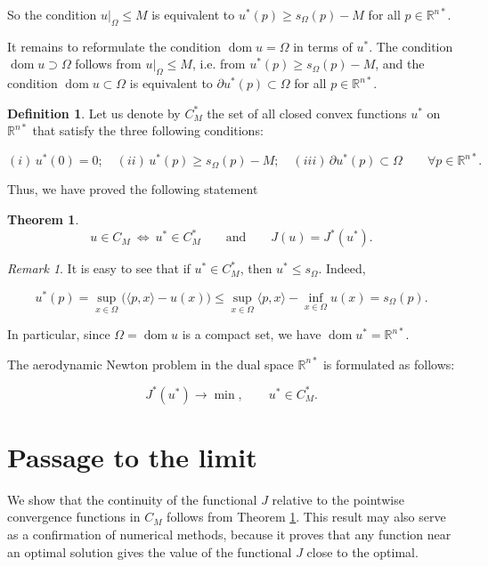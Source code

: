 \documentclass[14pt]{extarticle}
\renewcommand{\le}{\leqslant}
\renewcommand{\ge}{\geqslant}
\newcommand{\R}{\mathbb{R}}
\DeclareMathOperator{\dom}{\mathrm{dom}}
\newtheorem{thm}{Theorem}
\theoremstyle{remark}
\newtheorem{remark}{Remark}
\theoremstyle{definition}
\newtheorem{defn}{Definition}
\begin{document}
\noindent So the condition $u|_\Omega\le M$ is equivalent to $u^*(p)\ge s_\Omega(p)-M$ for all $p\in\R^{n*}$.

It remains to reformulate the condition $\dom u = \Omega$ in terms of $u^*$. The condition $\dom u\supset\Omega$ follows from $u|_\Omega\le M$, i.e. from $u^*(p)\ge s_\Omega(p)-M$, and the condition
$\dom u\subset\Omega$ is equivalent to
$\partial u^*(p)\subset \Omega$ for all $p\in\R^{n*}$.

\begin{defn}
Let us denote by $C_M^*$ the set of all closed convex functions $u^*$ on $\R^{n*}$ that satisfy the three following conditions:

	\[
		(i)\,u^*(0) = 0;
		\quad
		(ii)\,u^*(p)\ge s_\Omega(p)-M;
		\quad
		(iii)\,\partial u^*(p)\subset \Omega
		\qquad \forall p\in\R^{n*}.
	\]
\end{defn}

Thus, we have proved the following statement

\begin{thm}
\label{thm:Legandre_transform}
	\[
		u\in C_M \ \Longleftrightarrow\  u^*\in C_M^*
		\qquad\mbox{and}\qquad
		J(u)=J^*(u^*).
	\]

\end{thm}

\begin{remark}
	It is easy to see that if $u^*\in C_M^*$, then $u^*\le s_\Omega$. Indeed,
	
	\[
		u^*(p) = \sup_{x\in\Omega}\big(\langle p,x\rangle - u(x)\big) \le
		\sup_{x\in\Omega}\langle p,x\rangle - \inf_{x\in\Omega}u(x) = s_\Omega(p).
	\]
	
	\noindent In particular, since $\Omega=\dom u$ is a compact set, we have $\dom u^*=\R^{n*}$.
	
\end{remark}

The aerodynamic Newton problem in the dual space $\R^{n*}$ is formulated as follows:


\[
	J^*(u^*)\to\min,\qquad u^*\in C_M^*.
\]






\section{Passage to the limit}
\label{sec:pointwise_limit}


We show that the continuity of the functional $J$ relative to the pointwise convergence functions in $C_M$ follows from Theorem \ref{thm:Legandre_transform}. This result may also serve as a confirmation of numerical methods, because it proves that any function near an optimal solution gives the value of the functional $J$ close to the optimal.
\end{document}
